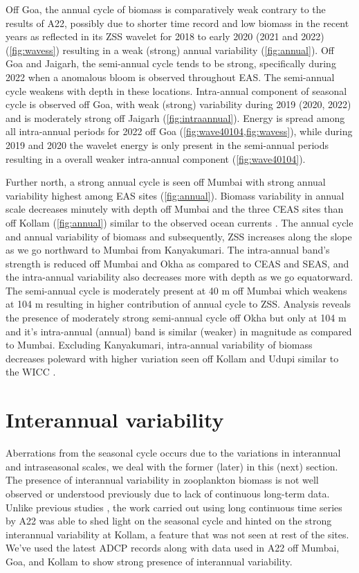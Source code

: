 \documentclass{article}
\begin{document}
	Off Goa, the annual cycle of biomass is comparatively weak contrary to the results of A22, possibly due to shorter time record and low biomass in the recent years as reflected in its ZSS wavelet for 2018 to early 2020 (2021 and 2022) (\cref{fig:wavess}) resulting in a weak (strong) annual variability (\cref{fig:annual}). Off Goa and Jaigarh, the semi-annual cycle tends to be strong, specifically during 2022 when a anomalous bloom is observed throughout EAS. The semi-annual cycle weakens with depth in these locations. Intra-annual component of seasonal cycle is observed off Goa, with weak (strong) variability during  2019 (2020, 2022) and is moderately strong off Jaigarh (\cref{fig:intraannual}). Energy is spread among all intra-annual periods for 2022 off Goa (\cref{fig:wave40104,fig:wavess}), while during 2019 and 2020 the wavelet energy is only present in the semi-annual periods resulting in a overall weaker intra-annual component (\cref{fig:wave40104}).
 
    Further north, a strong annual cycle is seen off Mumbai with strong annual variability highest among EAS sites (\cref{fig:annual}). Biomass variability in annual scale decreases minutely with depth off Mumbai and the three CEAS sites than off Kollam (\cref{fig:annual}) similar to the observed ocean currents \citep{chaudhuri2020observed,chaudhuri2021observed}. The annual cycle and annual variability of biomass and subsequently, ZSS increases along the slope as we go northward to Mumbai from Kanyakumari. The intra-annual band's strength is reduced off Mumbai and Okha as compared to CEAS and SEAS, and the intra-annual variability also decreases more with depth as we go equatorward. The semi-annual cycle is moderately present at 40 m off Mumbai which weakens at 104 m resulting in higher contribution of annual cycle to ZSS. Analysis reveals the presence of moderately strong semi-annual cycle off Okha but only at 104 m and it's intra-annual (annual) band is similar (weaker) in magnitude as compared to Mumbai. Excluding Kanyakumari, intra-annual variability of biomass decreases  poleward with higher variation seen off Kollam and Udupi similar to the WICC \citep{amol2014observed,chaudhuri2020observed}.	

	
	\section{Interannual variability}
	Aberrations from the seasonal cycle occurs due to the variations in interannual and intraseasonal scales, we deal with the former (later) in this (next) section. The presence of interannual variability in zooplankton biomass is not well observed or understood previously due to lack of continuous long-term data. Unlike previous studies \citep{madhupratap1996lack, jyothibabu2010re}, the work carried out using long continuous time series  by A22 was able to shed light on the seasonal cycle and hinted on the strong interannual variability at Kollam, a feature that was not seen at rest of the sites. We've used the latest ADCP records along with data used in A22 off Mumbai, Goa, and Kollam to show strong presence of interannual variability.
	
\end{document}
